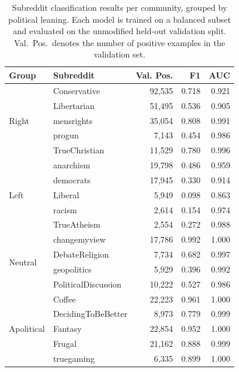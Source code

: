 \begin{table}[htbp]
\centering
\small
\caption{Subreddit classification results per community, grouped by political leaning. Each model is trained on a balanced subset and evaluated on the unmodified held-out validation split. Val.~Pos.\ denotes the number of positive examples in the validation set.}
\label{tab:subreddit_classification_per_community}
\begin{tabular}{llrrr}
\toprule
\textbf{Group} & \textbf{Subreddit} & \textbf{Val. Pos.} & \textbf{F1} & \textbf{AUC} \\
\midrule
\multirow{5}{*}{Right}
 & Conservative        & 92{,}535 & 0.718 & 0.921 \\
 & Libertarian         & 51{,}495 & 0.536 & 0.905 \\
 & mensrights          & 35{,}054 & 0.808 & 0.991 \\
 & progun              &  7{,}143 & 0.454 & 0.986 \\
 & TrueChristian       & 11{,}529 & 0.780 & 0.996 \\
\midrule
\multirow{5}{*}{Left}
 & anarchism           & 19{,}798 & 0.486 & 0.959 \\
 & democrats           & 17{,}945 & 0.330 & 0.914 \\
 & Liberal             &  5{,}949 & 0.098 & 0.863 \\
 & racism              &  2{,}614 & 0.154 & 0.974 \\
 & TrueAtheism         &  2{,}554 & 0.272 & 0.988 \\
\midrule
\multirow{4}{*}{Neutral}
 & changemyview        & 17{,}786 & 0.992 & 1.000 \\
 & DebateReligion      &  7{,}734 & 0.682 & 0.997 \\
 & geopolitics         &  5{,}929 & 0.396 & 0.992 \\
 & PoliticalDiscussion & 10{,}222 & 0.527 & 0.986 \\
\midrule
\multirow{5}{*}{Apolitical}
 & Coffee              & 22{,}223 & 0.961 & 1.000 \\
 & DecidingToBeBetter  &  8{,}973 & 0.779 & 0.999 \\
 & Fantasy             & 22{,}854 & 0.952 & 1.000 \\
 & Frugal              & 21{,}162 & 0.888 & 0.999 \\
 & truegaming          &  6{,}335 & 0.899 & 1.000 \\
\bottomrule
\end{tabular}
\end{table}

